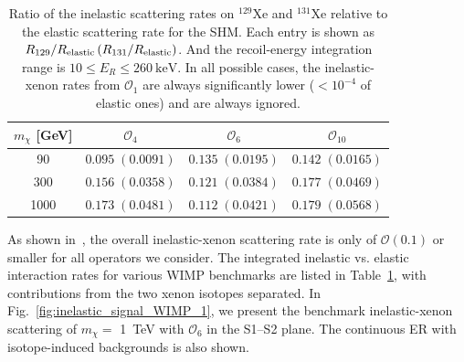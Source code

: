 \documentclass[11pt,a4paper]{article}
\renewcommand{\arraystretch}{1.2}
\begin{document}
\begin{table}[h!]
    \centering
    \renewcommand{\arraystretch}{1.25}
    \setlength{\tabcolsep}{12pt}
    
    \begin{tabular}{c|ccc}
        \hline
        $m_\chi$ [GeV]
        & $\mathcal{O}_4$
        & $\mathcal{O}_6$
        & $\mathcal{O}_{10}$ \\
        \hline

        90 %
        & $0.095\;(0.0091)$
        & $0.135\;(0.0195)$
        & $0.142\;(0.0165)$ \\
        
        300 %
        & $0.156\;(0.0358)$
        & $0.121\;(0.0384)$
        & $0.177\;(0.0469)$ \\
        
        1000
        & $0.173\;(0.0481)$
        & $0.112\;(0.0421)$
        & $0.179\;(0.0568)$ \\
        
        \hline
    \end{tabular}
\caption{
    Ratio of the inelastic scattering rates on $^{129}$Xe and $^{131}$Xe
    relative to the elastic scattering rate for the SHM.
    Each entry is shown as
    $R_{129}/R_{\rm elastic}\,
    (R_{131}/R_{\rm elastic})$. And the recoil-energy integration range is
        $10 \leq E_R \leq 260~\mathrm{keV}$. In all possible cases, the inelastic-xenon rates from $\mathcal{O}_1$ are always significantly lower ($<10^{-4}$ of elastic ones) and are always ignored.
    }    
    \label{tab:SHM_inelastic_elastic_ratio}
\end{table}

As shown in~\cite{Arcadi:2019hrw}, the overall inelastic-xenon scattering rate is only of $\mathcal{O}(0.1)$ or smaller for all operators we consider. The integrated inelastic vs. elastic interaction rates for various WIMP benchmarks are listed in Table~\ref{tab:SHM_inelastic_elastic_ratio}, with contributions from the two xenon isotopes separated. In Fig.~\ref{fig:inelastic_signal_WIMP_1}, we present the benchmark inelastic-xenon scattering of $m_\chi=$ 1~TeV with $\mathcal{O}_6$ in the S1--S2 plane. The continuous ER with isotope-induced backgrounds is also shown. 
\end{document}

